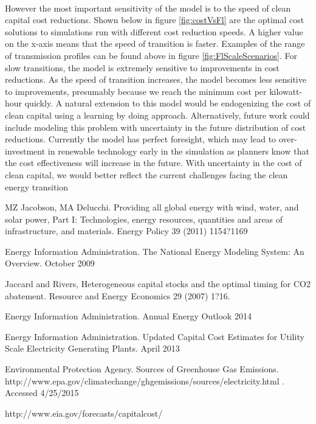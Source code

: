 \documentclass{article}
\begin{document}
\paragraph{} However the most important sensitivity of the model is to the speed of clean capital cost reductions. Shown below in figure \ref{fig:costVsFl} are the optimal cost solutions to simulations run with different cost reduction speeds. A higher value on the x-axis means that the speed of transition is faster. Examples of the range of transmission profiles can be found above in figure \ref{fig:FlScaleScenarios}. For slow transitions, the model is extremely sensitive to improvements in cost reductions. As the speed of transition increases, the model becomes less sensitive to improvements, presumably because we reach the minimum cost per kilowatt-hour quickly. A natural extension to this model would be endogenizing the cost of clean capital using a learning by doing approach. Alternatively, future work could include modeling this problem with uncertainty in the future distribution of cost reductions. Currently the model has perfect foresight, which may lead to over-investment in renewable technology early in the simulation as planners know that the cost effectiveness will increase in the future. With uncertainty in the cost of clean capital, we would better reflect the current challenges facing the clean energy transition











\pagebreak
{}

\begin{thebibliography}{99}

MZ Jacobson, MA Delucchi. Providing all global energy with wind, water, and solar power, Part I: Technologies, energy resources, quantities and areas of infrastructure, and materials. Energy Policy 39 (2011) 1154?1169

Energy Information Administration. The National Energy Modeling System: An Overview. October 2009

Jaccard and Rivers, Heterogeneous capital stocks and the optimal timing for CO2 abatement. Resource and Energy Economics 29 (2007) 1?16.

Energy Information Administration. Annual Energy Outlook 2014

Energy Information Administration. Updated Capital Cost Estimates for Utility Scale Electricity Generating Plants. April 2013


Environmental Protection Agency. Sources of Greenhouse Gas Emissions.  http://www.epa.gov/climatechange/ghgemissions/sources/electricity.html . Accessed 4/25/2015


http://www.eia.gov/forecasts/capitalcost/

\end{thebibliography}
\end{document}
